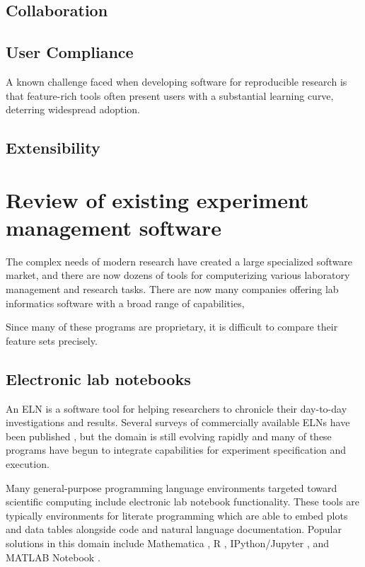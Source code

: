 \documentclass[../thesis]{subfiles}
\begin{document}
\subsection{Collaboration}



\subsection{User Compliance}
A known challenge faced when developing software for reproducible research
is that feature-rich tools often present users with a substantial
learning curve, deterring widespread adoption.



\subsection{Extensibility}



\section{Review of existing experiment management software}

The complex needs of modern research have created a large specialized
software market, and there are now dozens of tools for computerizing
various laboratory management and research tasks. There are now many
companies offering lab informatics software with a broad range of
capabilities,

Since many of these programs are proprietary, it is difficult to
compare their feature sets precisely.



\subsection{Electronic lab notebooks}

An \gls{ELN} is a software tool for helping
researchers to chronicle their day-to-day investigations and
results. Several surveys of commercially available ELNs have been
published \cite{Rubacha2011, }, but the domain is still evolving
rapidly and many of these programs have begun to integrate
capabilities for experiment specification and execution.

Many general-purpose programming language environments targeted toward
scientific computing include electronic lab notebook functionality.
These tools are typically environments for literate programming
\cite{Knuth:1984:LP:473.479} which are able to embed plots and data
tables alongside code and natural language documentation. Popular
solutions in this domain include Mathematica \cite{mathematica},
R \cite{Rlang}, IPython/Jupyter \cite{IPython}, and
MATLAB Notebook \cite{MATLAB}.
\end{document}
